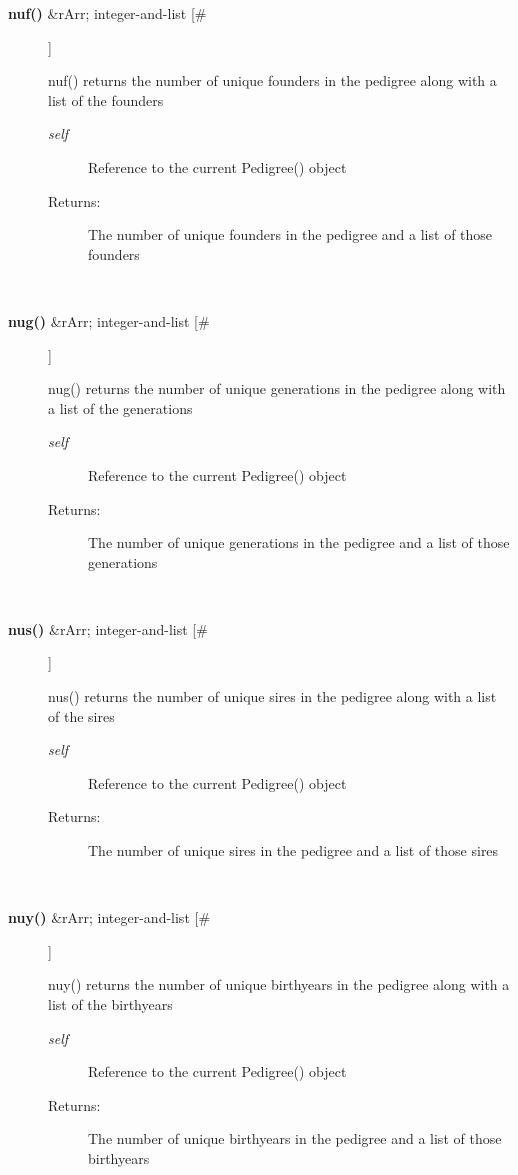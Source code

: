 \begin{description}
\item[\textbf{nuf()}
 \&rArr; integer-and-list [\#]]

 nuf() returns the number of unique founders in the pedigree along with a list of the founders
\begin{description}
\item[\emph{self}
] Reference to the current Pedigree() object
\item[Returns:] The number of unique founders in the pedigree and a list of those founders

\end{description}
\\ 

\item[\textbf{nug()}
 \&rArr; integer-and-list [\#]]

 nug() returns the number of unique generations in the pedigree along with a list of the generations
\begin{description}
\item[\emph{self}
] Reference to the current Pedigree() object
\item[Returns:] The number of unique generations in the pedigree and a list of those generations

\end{description}
\\ 

\item[\textbf{nus()}
 \&rArr; integer-and-list [\#]]

 nus() returns the number of unique sires in the pedigree along with a list of the sires
\begin{description}
\item[\emph{self}
] Reference to the current Pedigree() object
\item[Returns:] The number of unique sires in the pedigree and a list of those sires

\end{description}
\\ 

\item[\textbf{nuy()}
 \&rArr; integer-and-list [\#]]

 nuy() returns the number of unique birthyears in the pedigree along with a list of the birthyears
\begin{description}
\item[\emph{self}
] Reference to the current Pedigree() object
\item[Returns:] The number of unique birthyears in the pedigree and a list of those birthyears


\end{description}
\end{description}
